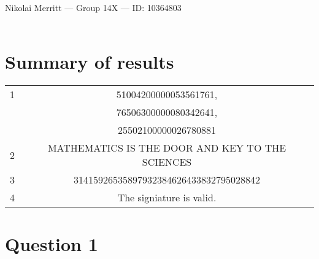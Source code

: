 \documentclass[11pt]{article}
\begin{document}
%
\noindent
Nikolai Merritt --- Group 14X --- ID: 10364803 \\ \\
\section*{Summary of results}
\begin{center}
    \begin{tabular}{|c|c|}
    \hline
        1 & 51004200000053561761, \\
         & 76506300000080342641, \\
         & 25502100000026780881 \\ \hline
        2 & MATHEMATICS IS THE DOOR AND KEY TO THE SCIENCES \\ \hline
        3 & 31415926535897932384626433832795028842 \\ \hline
        4 & The signiature is valid. \\ \hline
    \end{tabular}
\end{center}
\section*{Question 1}
\end{document}
